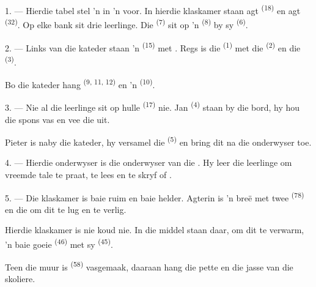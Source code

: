 \VUsaut{1.4mm}
\VUsaut{2.2mm}
\VUfilet{20mm}
\VUsaut{6.4mm}

\VUsaut{3.0mm}

1. --- Hierdie tabel stel 'n  in 'n  voor. In hierdie
klaskamer staan agt  \textsuperscript{(18)} en agt 
\textsuperscript{(32)}. Op elke bank sit drie leerlinge. Die 
\textsuperscript{(7)} sit op 'n  \textsuperscript{(8)} by sy
 \textsuperscript{(6)}.

2. --- Links van die kateder staan 'n  \textsuperscript{(15)} met
. Regs is die  \textsuperscript{(1)} met die
 \textsuperscript{(2)} en die  \textsuperscript{(3)}.

Bo die kateder hang  \textsuperscript{(9, 11, 12)} en 'n
 \textsuperscript{(10)}.

3. --- Nie al die leerlinge sit op hulle  \textsuperscript{(17)} nie. Jan
\textsuperscript{(4)} staan by die bord, hy hou die spons vas en vee die
 uit.

Pieter is naby die kateder, hy versamel die  \textsuperscript{(5)} en
bring dit na die onderwyser toe.

4. --- Hierdie onderwyser is die onderwyser van die . Hy leer die
leerlinge om vreemde tale te praat, te lees en te skryf  of .

5. --- Die klaskamer is baie ruim en baie helder. Agterin is 'n breë 
met twee  \textsuperscript{(78)} en die  om dit te
lug en te verlig.

Hierdie klaskamer is nie koud nie. In die middel staan daar, om dit te verwarm, 'n baie
goeie  \textsuperscript{(46)} met sy  \textsuperscript{(45)}.

Teen die muur is  \textsuperscript{(58)} vasgemaak, daaraan hang
die pette en die jasse van die skoliere.

\VUsaut{5.2mm}
\VUsaut{3.6mm}

